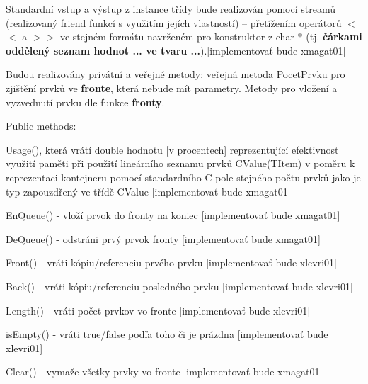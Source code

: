 \begin{DoxyEnumerate}
\begin{DoxyItemize}
\begin{DoxyItemize}
\end{DoxyItemize}
\end{DoxyItemize}
\item Standardní vstup a výstup z instance třídy {} bude realizován pomocí streamů (realizovaný {\ttfamily friend} funkcí s využitím jejích vlastností) – přetížením operátorů $<$$<$ a $>$$>$ ve stejném formátu navrženém pro konstruktor z {\ttfamily char} $\ast$ (tj. {\bfseries čárkami oddělený seznam hodnot ... ve tvaru ...}).\mbox{[}implementovať bude xmagat01\mbox{]}
\item Budou realizovány privátní a veřejné metody\+: veřejná metoda {\ttfamily Pocet\+Prvku} pro zjištění prvků ve {\bfseries fronte}, která nebude mít parametry. Metody pro vložení a vyzvednutí prvku dle funkce {\bfseries fronty}.

Public methods\+:
\begin{DoxyItemize}
\item {\ttfamily Usage()}, která vrátí {\ttfamily double} hodnotu \mbox{[}v procentech\mbox{]} reprezentující efektivnost využití paměti při použití lineárního seznamu prvků {\ttfamily C\+Value(\+T\+Item)} v poměru k reprezentaci kontejneru pomocí standardního C pole stejného počtu prvků jako je typ zapouzdřený ve třídě {\ttfamily C\+Value} \mbox{[}implementovať bude xmagat01\mbox{]}
\item En\+Queue() -\/ vloží prvok do fronty na koniec \mbox{[}implementovať bude xmagat01\mbox{]}
\item De\+Queue() -\/ odstráni prvý prvok fronty \mbox{[}implementovať bude xmagat01\mbox{]}
\item Front() -\/ vráti kópiu/referenciu prvého prvku \mbox{[}implementovať bude xlevri01\mbox{]}
\item Back() -\/ vráti kópiu/referenciu posledného prvku \mbox{[}implementovať bude xlevri01\mbox{]}
\item Length() -\/ vráti počet prvkov vo fronte \mbox{[}implementovať bude xlevri01\mbox{]}
\item is\+Empty() -\/ vráti true/false podľa toho či je prázdna \mbox{[}implementovať bude xlevri01\mbox{]}
\item Clear() -\/ vymaže všetky prvky vo fronte \mbox{[}implementovať bude xmagat01\mbox{]}
\end{DoxyItemize}


\end{DoxyEnumerate}
